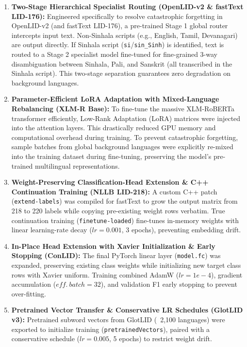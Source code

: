 \documentclass[conference]{IEEEtran}
\begin{document}
\begin{enumerate}
    \item \textbf{Two-Stage Hierarchical Specialist Routing (OpenLID-v2 \& fastText LID-176):} Engineered specifically to resolve catastrophic forgetting in OpenLID-v2 (and fastText LID-176), a pre-trained Stage 1 global router intercepts input text. Non-Sinhala scripts (e.g., English, Tamil, Devanagari) are output directly. If Sinhala script (\texttt{si}/\texttt{sin\_Sinh}) is identified, text is routed to a Stage 2 specialist model fine-tuned for fine-grained 3-way disambiguation between Sinhala, Pali, and Sanskrit (all transcribed in the Sinhala script). This two-stage separation guarantees zero degradation on background languages.
    \item \textbf{Parameter-Efficient LoRA Adaptation with Mixed-Language Rebalancing (XLM-R Base):} To fine-tune the massive XLM-RoBERTa transformer efficiently, Low-Rank Adaptation (LoRA) \cite{b16} matrices were injected into the attention layers. This drastically reduced GPU memory and computational overhead during training. To prevent catastrophic forgetting, sample batches from global background languages were explicitly re-mixed into the training dataset during fine-tuning, preserving the model's pre-trained multilingual representations.
    \item \textbf{Weight-Preserving Classification-Head Extension \& C++ Continuation Training (NLLB LID-218):} A custom C++ patch (\texttt{extend-labels}) was compiled for fastText to grow the output matrix from 218 to 220 labels while copying pre-existing weight rows verbatim. True continuation training (\texttt{finetune-loaded}) fine-tunes in-memory weights with linear learning-rate decay ($lr=0.001$, 3 epochs), preventing embedding drift.
    \item \textbf{In-Place Head Extension with Xavier Initialization \& Early Stopping (ConLID):} The final PyTorch linear layer (\texttt{model.fc}) was expanded, preserving existing class weights while initializing new target class rows with Xavier uniform. Training combined AdamW ($lr=1e-4$), gradient accumulation ($eff.\ batch=32$), and validation F1 early stopping to prevent over-fitting.
    \item \textbf{Pretrained Vector Transfer \& Conservative LR Schedules (GlotLID v3):} Pretrained subword vectors from GlotLID (~2,100 languages) were exported to initialize training (\texttt{pretrainedVectors}), paired with a conservative schedule ($lr=0.005$, 5 epochs) to restrict weight drift.
\end{enumerate}
\end{document}
